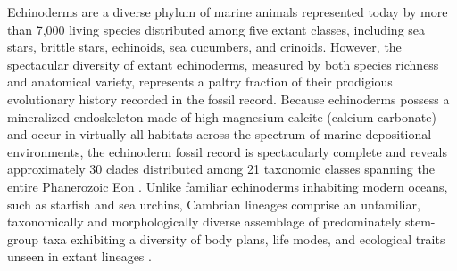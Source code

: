 \documentclass{article}
\begin{document}
Echinoderms are a diverse phylum of marine animals represented today by more than 7,000 living species \citep{brusca2003} distributed among five extant classes, including sea stars, brittle stars, echinoids, sea cucumbers, and crinoids. However, the spectacular diversity of extant echinoderms, measured by both species richness and anatomical variety, represents a paltry fraction of their prodigious evolutionary history recorded in the fossil record. Because echinoderms possess a mineralized endoskeleton made of high-magnesium calcite (calcium carbonate) and occur in virtually all habitats across the spectrum of marine depositional environments, the echinoderm fossil record is spectacularly complete and reveals approximately 30 clades distributed among 21 taxonomic classes spanning the entire Phanerozoic Eon \citep{SprinkleKier1987, Sumrall1997, SumrallWaters2012, ZamoraRahman2014, WrightEtAl2017, SheffieldSumrall2019}. Unlike familiar echinoderms inhabiting modern oceans, such as starfish and sea urchins, Cambrian lineages comprise an unfamiliar, taxonomically and morphologically diverse assemblage of predominately stem-group taxa exhibiting a diversity of body plans, life modes, and ecological traits unseen in extant lineages \citep{Sprinkle1973, ZamoraEtAl2013, ZamoraRahman2014}.
\end{document}
